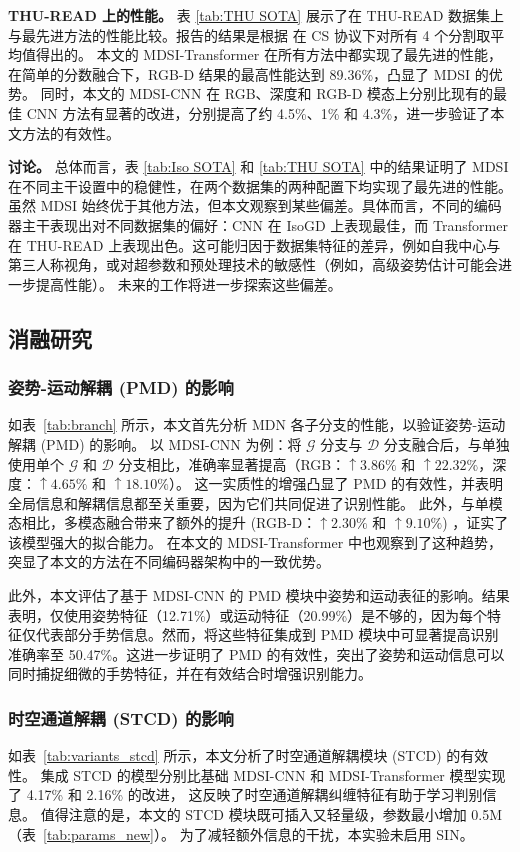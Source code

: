 \textbf{THU-READ 上的性能。}
表 \ref{tab:THU SOTA} 展示了在 THU-READ 数据集上与最先进方法的性能比较。报告的结果是根据 \cite{tang2018multi} 在 CS 协议下对所有 4 个分割取平均值得出的。
本文的 MDSI-Transformer 在所有方法中都实现了最先进的性能，在简单的分数融合下，RGB-D 结果的最高性能达到 89.36\%，凸显了 MDSI 的优势。
同时，本文的 MDSI-CNN 在 RGB、深度和 RGB-D 模态上分别比现有的最佳 CNN 方法有显著的改进，分别提高了约 4.5\%、1\% 和 4.3\%，进一步验证了本文方法的有效性。

\textbf{讨论。}
总体而言，表 \ref{tab:Iso SOTA} 和 \ref{tab:THU SOTA} 中的结果证明了 MDSI 在不同主干设置中的稳健性，在两个数据集的两种配置下均实现了最先进的性能。虽然 MDSI 始终优于其他方法，但本文观察到某些偏差。具体而言，不同的编码器主干表现出对不同数据集的偏好：CNN 在 IsoGD 上表现最佳，而 Transformer 在 THU-READ 上表现出色。这可能归因于数据集特征的差异，例如自我中心与第三人称视角，或对超参数和预处理技术的敏感性（例如，高级姿势估计可能会进一步提高性能）。
未来的工作将进一步探索这些偏差。

\subsection{消融研究}
\subsubsection{姿势-运动解耦 (PMD) 的影响}
如表~\ref{tab:branch} 所示，本文首先分析 MDN 各子分支的性能，以验证姿势-运动解耦 (PMD) 的影响。
以 MDSI-CNN 为例：将 $\mathcal{G}$ 分支与 $\mathcal{D}$ 分支融合后，与单独使用单个 $\mathcal{G}$ 和 $\mathcal{D}$ 分支相比，准确率显著提高（RGB：$\uparrow3.86\%$ 和 $\uparrow22.32\%$，深度：$\uparrow4.65\%$ 和 $\uparrow18.10\%$）。
这一实质性的增强凸显了 PMD 的有效性，并表明全局信息和解耦信息都至关重要，因为它们共同促进了识别性能。
此外，与单模态相比，多模态融合带来了额外的提升 (RGB-D：$\uparrow2.30\%$ 和 $\uparrow9.10\%$) ，证实了该模型强大的拟合能力。
在本文的 MDSI-Transformer 中也观察到了这种趋势，突显了本文的方法在不同编码器架构中的一致优势。

此外，本文评估了基于 MDSI-CNN 的 PMD 模块中姿势和运动表征的影响。结果表明，仅使用姿势特征（12.71\%）或运动特征（20.99\%）是不够的，因为每个特征仅代表部分手势信息。然而，将这些特征集成到 PMD 模块中可显著提高识别准确率至 50.47\%。这进一步证明了 PMD 的有效性，突出了姿势和运动信息可以同时捕捉细微的手势特征，并在有效结合时增强识别能力。

\subsubsection{时空通道解耦 (STCD) 的影响}
\label{sec:ablation_STCD}
如表~\ref{tab:variants_stcd} 所示，本文分析了时空通道解耦模块 (STCD) 的有效性。
集成 STCD 的模型分别比基础 MDSI-CNN 和 MDSI-Transformer 模型实现了 4.17\% 和 2.16\% 的改进，
这反映了时空通道解耦纠缠特征有助于学习判别信息。
值得注意的是，本文的 STCD 模块既可插入又轻量级，参数最小增加 0.5M（表~\ref{tab:params_new}）。
为了减轻额外信息的干扰，本实验未启用 SIN。


